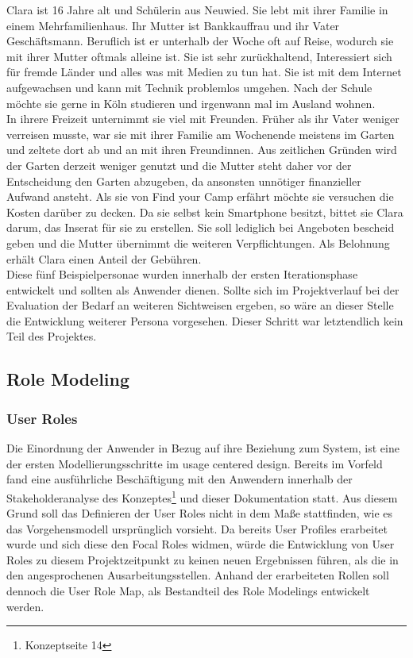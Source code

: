 Clara ist 16 Jahre alt und Schülerin aus Neuwied. 
Sie lebt mit ihrer Familie in einem Mehrfamilienhaus. Ihr Mutter ist Bankkauffrau und ihr Vater Geschäftsmann. Beruflich ist er unterhalb der Woche oft auf Reise, wodurch sie mit ihrer Mutter oftmals alleine ist.
Sie ist sehr zurückhaltend, Interessiert sich für fremde Länder und alles was mit Medien zu tun hat. Sie ist mit dem Internet aufgewachsen und kann mit Technik problemlos umgehen.
Nach der Schule möchte sie gerne in Köln studieren und irgenwann mal im Ausland wohnen.\\
In ihrere Freizeit unternimmt sie viel mit Freunden. Früher als ihr Vater weniger verreisen musste, war sie mit ihrer Familie am Wochenende meistens im Garten und zeltete dort ab und an mit ihren Freundinnen.
Aus zeitlichen Gründen wird der Garten derzeit weniger genutzt und die Mutter steht daher vor der Entscheidung den Garten abzugeben, da ansonsten unnötiger finanzieller Aufwand ansteht.
Als sie von Find your Camp erfährt möchte sie versuchen die Kosten darüber zu decken. Da sie selbst kein Smartphone besitzt, bittet sie Clara darum, das Inserat für sie zu erstellen. Sie soll lediglich bei Angeboten bescheid geben und die Mutter übernimmt die weiteren Verpflichtungen. Als Belohnung erhält Clara einen Anteil der Gebühren.\\


Diese fünf Beispielpersonae wurden innerhalb der ersten Iterationsphase entwickelt und sollten als Anwender dienen. 
Sollte sich im Projektverlauf bei der Evaluation der Bedarf an weiteren Sichtweisen ergeben, so wäre an dieser Stelle die Entwicklung weiterer Persona vorgesehen. Dieser Schritt war letztendlich kein Teil des Projektes.

\newpage
\subsection{Role Modeling}
\subsubsection{User Roles}
Die Einordnung der Anwender in Bezug auf ihre Beziehung zum System, ist eine der ersten Modellierungsschritte im usage centered design. Bereits im Vorfeld fand eine ausführliche Beschäftigung mit den Anwendern innerhalb der Stakeholderanalyse des Konzeptes\footnote{Konzeptseite 14} und dieser Dokumentation statt. Aus diesem Grund soll das Definieren der User Roles nicht in dem Maße stattfinden, wie es das Vorgehensmodell ursprünglich vorsieht.
Da bereits User Profiles erarbeitet wurde und sich diese den Focal Roles widmen, würde die Entwicklung von User Roles zu diesem Projektzeitpunkt zu keinen neuen Ergebnissen führen, als die in den angesprochenen Ausarbeitungsstellen. Anhand der erarbeiteten Rollen soll dennoch die User Role Map, als Bestandteil des Role Modelings entwickelt werden.

